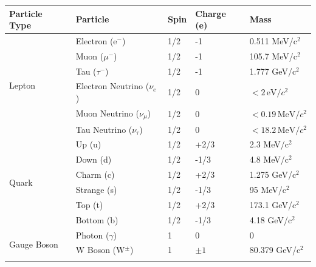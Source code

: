 \begin{table}[ht]
\centering
\begin{tabular}{|l|l|l|l|l|}
\hline
\textbf{Particle Type} & \textbf{Particle} & \textbf{Spin} & \textbf{Charge (e)} & \textbf{Mass}            \\ \hline
\multirow{6}{*}{Lepton}& Electron (e\(^-\))        & 1/2           & -1               & 0.511 MeV/c\(^2\)        \\ \cline{2-5}
                       & Muon (\(\mu^-\))          & 1/2           & -1               & 105.7 MeV/c\(^2\)        \\ \cline{2-5}
                       & Tau (\(\tau^-\))          & 1/2           & -1               & 1.777 GeV/c\(^2\)        \\ \cline{2-5}
                       & Electron Neutrino (\(\nu_e\))    & 1/2           & 0                & $< 2 \, \text{eV}/c^2$           \\ \cline{2-5}
                       & Muon Neutrino (\(\nu_{\mu}\))    & 1/2           & 0                & $< 0.19 \, \text{MeV}/c^2$       \\ \cline{2-5}
                       & Tau Neutrino (\(\nu_{\tau}\))    & 1/2           & 0                & $< 18.2 \, \text{MeV}/c^2$       \\ \hline
\multirow{6}{*}{Quark} & Up (u)                & 1/2           & +2/3              & 2.3 MeV/c\(^2\)          \\ \cline{2-5}
                       & Down (d)              & 1/2           & -1/3              & 4.8 MeV/c\(^2\)          \\ \cline{2-5}
                       & Charm (c)             & 1/2           & +2/3              & 1.275 GeV/c\(^2\)        \\ \cline{2-5}
                       & Strange (s)           & 1/2           & -1/3              & 95 MeV/c\(^2\)           \\ \cline{2-5}
                       & Top (t)               & 1/2           & +2/3              & 173.1 GeV/c\(^2\)        \\ \cline{2-5}
                       & Bottom (b)            & 1/2           & -1/3              & 4.18 GeV/c\(^2\)         \\ \hline
\multirow{4}{*}{Gauge Boson} & Photon (\(\gamma\))         & 1             & 0                & 0                        \\ \cline{2-5}
                       & W Boson (W\(^{\pm}\))       & 1             & \(\pm 1\)        & 80.379 GeV/c\(^2\)       \\ \cline{2-5}

\end{tabular}
\end{table}
